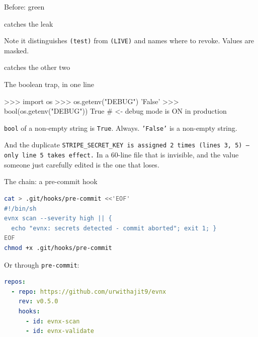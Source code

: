 \documentclass[aspectratio=169,10pt]{beamer}
\begin{document}
\begin{frame}[fragile]{Before: green}
\end{frame}

\begin{frame}[fragile]{ catches the leak}

  {\footnotesize Note it distinguishes \texttt{(test)} from \texttt{(LIVE)} and
  names where to revoke. Values are masked.}
\end{frame}

\begin{frame}[fragile]{ catches the other two}
\end{frame}

\begin{frame}[fragile]{The boolean trap, in one line}
\begin{semiverbatim}\small
>>> import os
>>> os.getenv("DEBUG")
'False'
>>> bool(os.getenv("DEBUG"))
True          \# <- debug mode is ON in production
\end{semiverbatim}

  \vspace{0.6em}
  \texttt{bool} of a non-empty string is \texttt{True}. Always. \texttt{'False'}
  is a non-empty string.

  \vspace{0.8em}
  \begin{block}{And the duplicate}
    \texttt{STRIPE\_SECRET\_KEY is assigned 2 times (lines 3, 5) — only line 5
    takes effect.} In a 60-line file that is invisible, and the value someone
    just carefully edited is the one that loses.
  \end{block}
\end{frame}

\begin{frame}[fragile]{The chain: a pre-commit hook}
\begin{lstlisting}[style=evnxcode,language=bash]
cat > .git/hooks/pre-commit <<'EOF'
#!/bin/sh
evnx scan --severity high || {
  echo "evnx: secrets detected - commit aborted"; exit 1; }
EOF
chmod +x .git/hooks/pre-commit
\end{lstlisting}

  Or through \texttt{pre-commit}:

\begin{lstlisting}[style=evnxcode,language=yaml]
repos:
  - repo: https://github.com/urwithajit9/evnx
    rev: v0.5.0
    hooks:
      - id: evnx-scan
      - id: evnx-validate
\end{lstlisting}
\end{frame}
\end{document}
